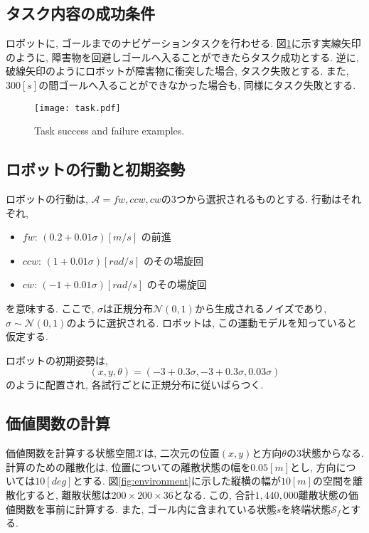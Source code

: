 \subsection{タスク内容の成功条件}
ロボットに, ゴールまでのナビゲーションタスクを行わせる. 
図\ref{fig:task}に示す実線矢印のように, 障害物を回避しゴールへ入ることができたらタスク成功とする. 
逆に, 破線矢印のようにロボットが障害物に衝突した場合, タスク失敗とする. 
また, $300[\si{s}]$の間ゴールへ入ることができなかった場合も, 同様にタスク失敗とする. 

\begin{figure}[tbp]
  \begin{center}
    \texttt{[image: task.pdf]}
    \caption{Task success and failure examples.}
    \label{fig:task}
  \end{center}
\end{figure}

\subsection{ロボットの行動と初期姿勢}
ロボットの行動は, $\mathcal{A} = { fw, ccw, cw }$の3つから選択されるものとする. 
行動はそれぞれ, 
\begin{itemize}
  \item $fw$: $(0.2 + 0.01\sigma) \si{[m/s]}$ の前進
  \item $ccw$: $(1 + 0.01\sigma) \si{[rad/s]}$ のその場旋回
  \item $cw$: $(-1 + 0.01\sigma) \si{[rad/s]}$ のその場旋回
\end{itemize}
を意味する. 
ここで, $\sigma$は正規分布$\mathcal{N}(0, 1)$から生成されるノイズであり, $\sigma \sim \mathcal{{N}}(0, 1)$のように選択される. 
ロボットは, この運動モデルを知っていると仮定する. 

ロボットの初期姿勢は, 
\begin{equation}
\label{robot initial pose}
  (x, y, \theta) = (-3 + 0.3\sigma, -3 + 0.3\sigma, 0.03\sigma)
\end{equation}
のように配置され, 各試行ごとに正規分布に従いばらつく. 

\subsection{価値関数の計算}
価値関数を計算する状態空間$\mathcal{X}$は, 二次元の位置$(x, y)$と方向$\theta$の3状態からなる. 
計算のための離散化は, 位置についての離散状態の幅を$0.05\si{[m]}$とし, 方向については$10\si{[deg]}$とする. 
図\ref{fig:environment}に示した縦横の幅が$10\si{[m]}$の空間を離散化すると, 離散状態は$200 \times 200 \times 36$となる. 
この, 合計$1,440,000$離散状態の価値関数を事前に計算する. 
また, ゴール内に含まれている状態$s$を終端状態$\mathcal{S}_f$とする. 

